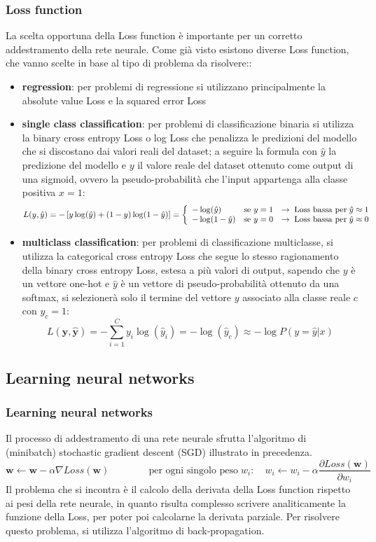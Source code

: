 \subsubsection*{Loss function}
\label{sec:loss_functions}
La scelta opportuna della Loss function è importante per un corretto addestramento della rete neurale. Come già visto
esistono diverse Loss function, che vanno scelte in base al tipo di problema da risolvere::
\begin{itemize}
	\item \textbf{regression}: per problemi di regressione si utilizzano principalmente la absolute value Loss e la squared
	error Loss
	\item \textbf{single class classification}: per problemi di classificazione binaria si utilizza la binary cross entropy
	Loss o log Loss che penalizza le predizioni del modello che si discostano dai valori reali del dataset; a seguire la formula
	con \(\hat{y}\) la predizione del modello e \(y\) il valore reale del dataset ottenuto come output di una sigmoid, ovvero
	la pseudo-probabilità che l'input appartenga alla classe positiva \(x = 1\):
	\[L(y, \hat{y}) = -\left[y \log(\hat{y}) + (1-y) \log(1-\hat{y})\right] = \left\{\begin{array}{l l l}
		-\log(\hat{y}) & \text{se } y = 1 & \rightarrow \; \text{Loss bassa per} \; \hat{y} \approx 1 \\
		-\log(1-\hat{y}) & \text{se } y = 0 & \rightarrow \; \text{Loss bassa per} \; \hat{y} \approx 0
	\end{array}\right.\]
	\item \textbf{multiclass classification}: per problemi di classificazione multiclasse, si utilizza la categorical cross
	entropy Loss che segue lo stesso ragionamento della binary cross entropy Loss, estesa a più valori di output, sapendo che
	\(y\) è un vettore one-hot e \(\hat{y}\) è un vettore di pseudo-probabilità ottenuto da una softmax, si selezionerà solo
	il termine del vettore \(y\) associato alla classe reale \(c\) con \(y_c = 1\):
	\[L(\textbf{y}, \hat{\textbf{y}}) = -\sum_{i=1}^C y_i \log(\hat{y}_i) = -\log(\hat{y}_c) \approx - \log P(y = \hat{y} | x)\]
\end{itemize}

\subsection{Learning neural networks}
\subsubsection*{Learning neural networks}
Il processo di addestramento di una rete neurale sfrutta l'algoritmo di (minibatch) stochastic gradient descent (SGD) illustrato
in precedenza.
\[\textbf{w} \gets \textbf{w} - \alpha \nabla Loss (\textbf{w}) \qquad\qquad \text{per ogni singolo peso} \; w_i: \quad w_i \gets w_i - \alpha \frac{\partial Loss(\textbf{w})}{\partial w_i}\]
Il problema che si incontra è il calcolo della derivata della Loss function rispetto ai pesi della rete neurale, in quanto
risulta complesso scrivere analiticamente la funzione della Loss, per poter poi calcolarne la derivata parziale. Per risolvere
questo problema, si utilizza l'algoritmo di back-propagation.

